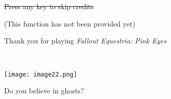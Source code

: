 ~\vfill


\clearpage

~\vfill

\begin{center}

    \sout{Press any key to skip credits}
    
    (This function has not been provided yet)

    \vspace{\baselineskip}

    Thank you for playing \emph{Fallout Equestria: Pink Eyes}

\end{center}

~\vfill

\texttt{[image: image22.png]}

\begin{motto}
    Do you believe in ghosts?
\end{motto}

